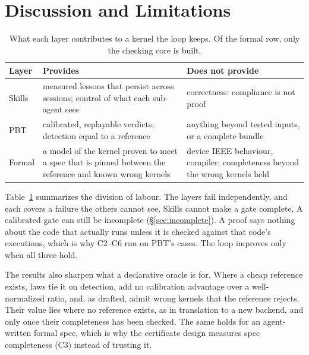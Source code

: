 \section{Discussion and Limitations}
\label{sec:discussion}

\begin{table}[t]
\centering
\small
\setlength{\tabcolsep}{3pt}
\begin{tabular}{@{}p{}p{}p{}@{}}
\toprule
Layer & Provides & Does not provide \\
\midrule
Skills & measured lessons that persist across sessions; control of what each sub-agent sees
       & correctness: compliance is not proof \\
PBT    & calibrated, replayable verdicts; detection equal to a reference
       & anything beyond tested inputs, or a complete bundle \\
Formal & a model of the kernel proven to meet a spec that is pinned between the reference and known wrong kernels
       & device IEEE behaviour, compiler; completeness beyond the wrong kernels held \\
\bottomrule
\end{tabular}
\caption{What each layer contributes to a kernel the loop keeps. Of the formal row,
  only the checking core is built.}
\label{tab:layers}
\end{table}

Table~\ref{tab:layers} summarizes the division of labour. The layers fail independently,
and each covers a failure the others cannot see. Skills cannot make a gate complete. A
calibrated gate can still be incomplete (\S\ref{sec:incomplete}). A proof says nothing
about the code that actually runs unless it is checked against that code's executions,
which is why C2--C6 run on PBT's cases. The loop improves only when all three hold.

The results also sharpen what a declarative oracle is for. Where a cheap reference
exists, laws tie it on detection, add no calibration advantage over a well-normalized
ratio, and, as drafted, admit wrong kernels that the reference rejects. Their value lies
where no reference exists, as in translation to a new backend, and only once their
completeness has been checked. The same holds for an agent-written formal spec, which is
why the certificate design measures spec completeness (C3) instead of trusting it.

